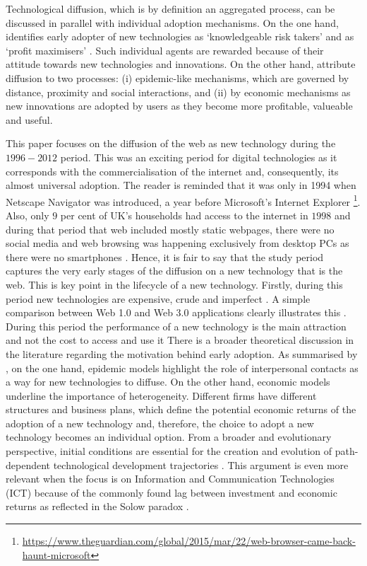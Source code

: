 \documentclass[
  authoryear,
  preprint,
  3p]{elsarticle}
\begin{document}
Technological diffusion, which is by definition an aggregated process,
can be discussed in parallel with individual adoption mechanisms. On the
one hand, \citet{rogers2010diffusion} identifies early adopter of new
technologies as `knowledgeable risk takers' and \citet{griliches1957} as
`profit maximisers' \citep{ding2010modeling}. Such individual agents are
rewarded because of their attitude towards new technologies and
innovations. On the other hand, \citet{perkins2011internet} attribute
diffusion to two processes: (i) epidemic-like mechanisms, which are
governed by distance, proximity and social interactions, and (ii) by
economic mechanisms as new innovations are adopted by users as they
become more profitable, valueable and useful.

This paper focuses on the diffusion of the web as new technology during
the \(1996-2012\) period. This was an exciting period for digital
technologies as it corresponds with the commercialisation of the
internet and, consequently, its almost universal adoption. The reader is
reminded that it was only in 1994 when Netscape Navigator was
introduced, a year before Microsoft's Internet Explorer \footnote{\url{https://www.theguardian.com/global/2015/mar/22/web-browser-came-back-haunt-microsoft}}.
Also, only \(9\) per cent of UK's households had access to the internet
in \(1998\) \citep{ons2018} and during that period that web included
mostly static webpages, there were no social media and web browsing was
happening exclusively from desktop PCs as there were no smartphones
\citep{tranosuk}. Hence, it is fair to say that the study period
captures the very early stages of the diffusion on a new technology that
is the web. This is key point in the lifecycle of a new technology.
Firstly, during this period new technologies are expensive, crude and
imperfect \citep{rosenberg1994exploring, wilson201281}. A simple
comparison between Web 1.0 and Web 3.0 applications clearly illustrates
this \citep{tranos2020social}. During this period the performance of a
new technology is the main attraction and not the cost to access and use
it \citep{wilson2011lessons} There is a broader theoretical discussion
in the literature regarding the motivation behind early adoption. As
summarised by \citet{perkins2005international}, on the one hand,
epidemic models highlight the role of interpersonal contacts as a way
for new technologies to diffuse. On the other hand, economic models
underline the importance of heterogeneity. Different firms have
different structures and business plans, which define the potential
economic returns of the adoption of a new technology and, therefore, the
choice to adopt a new technology becomes an individual option. From a
broader and evolutionary perspective, initial conditions are essential
for the creation and evolution of path-dependent technological
development trajectories \citep{neffke2011regions, simmie2014new}. This
argument is even more relevant when the focus is on Information and
Communication Technologies (ICT) because of the commonly found lag
between investment and economic returns as reflected in the Solow
paradox \citep{acemoglu2014return, brynjolfsson2018artificial}.
\end{document}
